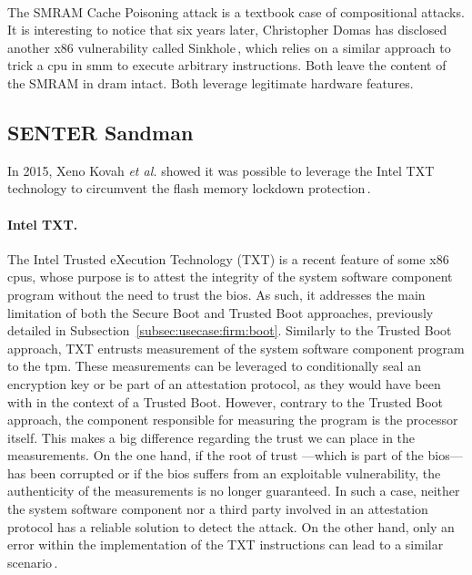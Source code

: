 \paragraph{}
%
The SMRAM Cache Poisoning attack is a textbook case of compositional attacks.
%
It is interesting to notice that six years later, Christopher Domas has
disclosed another x86 vulnerability called Sinkhole\,\cite{domas2015sinkhole},
which relies on a similar approach to trick a \ac{cpu} in \ac{smm} to execute
arbitrary instructions.
%
Both leave the content of the SMRAM in \ac{dram} intact.
%
Both leverage legitimate hardware features.

\subsection{SENTER Sandman}
\label{subsec:usecase:hse:sandman}

In 2015, Xeno Kovah \emph{et al.} showed it was possible to leverage the Intel TXT
technology to circumvent the flash memory lockdown
protection\,\cite{kovah2015senter}.

\paragraph{Intel TXT.}
%
The Intel Trusted eXecution Technology (TXT)\cite{intel2015txt} is a recent
feature of some x86 \acp{cpu}, whose purpose is to attest the integrity of the
system software component program without the need to trust the \ac{bios}.
%
As such, it addresses the main limitation of both the Secure Boot and Trusted
Boot approaches, previously detailed in
Subsection~\ref{subsec:usecase:firm:boot}.
%
Similarly to the Trusted Boot approach, TXT entrusts measurement of the system
software component program to the \ac{tpm}.
%
These measurements can be leveraged to conditionally seal an encryption key or
be part of an attestation protocol, as they would have been with in the context
of a Trusted Boot.
%
However, contrary to the Trusted Boot approach, the component responsible for
measuring the program is the processor itself.
%
This makes a big difference regarding the trust we can place in the
measurements.
%
On the one hand, if the root of trust ---which is part of the \ac{bios}--- has
been corrupted or if the \ac{bios} suffers from an exploitable vulnerability, the authenticity of the
measurements is no longer guaranteed.
%
In such a case, neither the system software component nor a third party involved
in an attestation protocol has a reliable solution to detect the attack.
%
On the other hand, only an error within the implementation of the TXT
instructions can lead to a similar scenario\,\cite{wojtczuk2011txtbug}.

